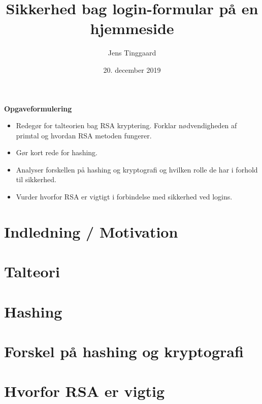 \documentclass[a4paper, 12pt]{article}
\date{20. december 2019}
\title{Sikkerhed bag login-formular på en hjemmeside}
\author{Jens Tinggaard}
\theoremstyle{break}
\theoremstyle{breakline}
\numberwithin{equation}{section}
\begin{document}
\thispagestyle{empty}


%
%
%

\begin{center}
    \LARGE
    \textbf{Opgaveformulering}
\end{center}

{
\large
\begin{itemize}
    \item Redegør for talteorien bag RSA kryptering. Forklar nødvendigheden af primtal og hvordan RSA metoden fungerer.
    \item Gør kort rede for hashing.
    \item Analyser forskellen på hashing og kryptografi og hvilken rolle de har i forhold til sikkerhed.
    \item Vurder hvorfor RSA er vigtigt i forbindelse med sikkerhed ved logins.
\end{itemize}
}





\tableofcontents


\newpage
\section*{Indledning / Motivation}



\newpage
\section{Talteori}\label{sec:numtheory}



\newpage
\section{Hashing}



\newpage
\section{Forskel på hashing og kryptografi}



\newpage
\section{Hvorfor RSA er vigtig}

\end{document}
